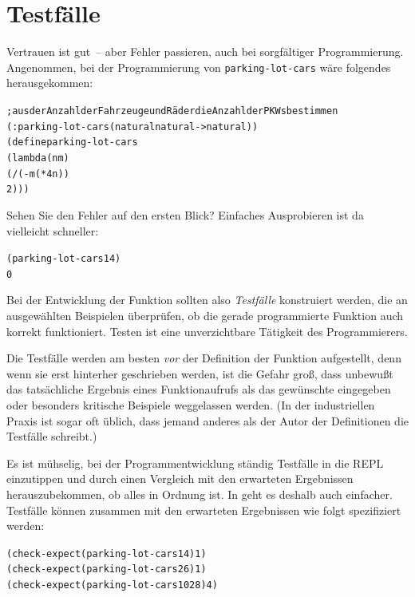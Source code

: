 \section{Testfälle}
\label{sec:test-cases}

Vertrauen ist gut~-- aber Fehler passieren, auch bei 
sorgfältiger Programmierung.  Angenommen, bei der Programmierung von
\texttt{parking-lot-cars} wäre folgendes herausgekommen:
%
\begin{alltt}
; aus der Anzahl der Fahrzeuge und Räder die Anzahl der PKWs bestimmen
(: parking-lot-cars (natural natural -> natural))
(define parking-lot-cars
  (lambda (n m)
    (/ (- m (* 4 n))
       2)))
\end{alltt}
%
Sehen Sie den Fehler auf den ersten Blick?  
Einfaches Ausprobieren ist da vielleicht schneller:
%
\begin{alltt}
(parking-lot-cars 1 4)
\evalsto{} 0
\end{alltt}
%
Bei der Entwicklung der Funktion sollten also
\textit{Testfälle} konstruiert werden, die an
ausgewählten Beispielen überprüfen, ob die gerade programmierte
Funktion auch korrekt funktioniert.  Testen ist eine unverzichtbare
Tätigkeit des Programmierers.

Die Testfälle werden am besten \emph{vor} der Definition der Funktion
aufgestellt, denn  wenn sie erst hinterher geschrieben werden, ist die
Gefahr groß, dass unbewußt das tatsächliche Ergebnis
eines Funktionaufrufs als das gewünschte eingegeben oder besonders
kritische Beispiele weggelassen werden.  (In der industriellen Praxis ist sogar
oft üblich, dass jemand anderes als der Autor der Definitionen
die Testfälle schreibt.)

Es ist mühselig, bei der Programmentwicklung ständig Testfälle in die
REPL einzutippen und durch einen Vergleich mit den erwarteten
Ergebnissen herauszubekommen, ob alles in Ordnung ist.  In \drscheme{}
geht es deshalb auch einfacher.  Testfälle können zusammen mit den
erwarteten Ergebnissen wie folgt spezifiziert werden:

\begin{alltt}
(check-expect (parking-lot-cars 1 4) 1)  
(check-expect (parking-lot-cars 2 6) 1)  
(check-expect (parking-lot-cars 10 28) 4)  
\end{alltt}

